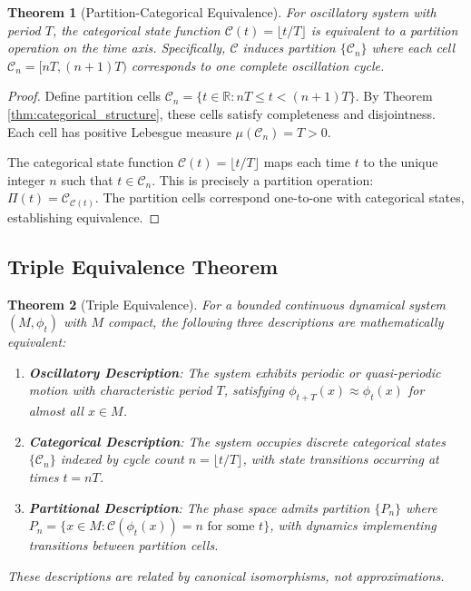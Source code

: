 \documentclass[twocolumn,10pt]{article}
\newtheorem{theorem}{Theorem}[section]
\begin{document}
\begin{theorem}[Partition-Categorical Equivalence]
\label{thm:partition_categorical}
For oscillatory system with period $T$, the categorical state function $\mathcal{C}(t) = \lfloor t/T \rfloor$ is equivalent to a partition operation on the time axis. Specifically, $\mathcal{C}$ induces partition $\{\mathcal{C}_n\}$ where each cell $\mathcal{C}_n = [nT, (n+1)T)$ corresponds to one complete oscillation cycle.
\end{theorem}

\begin{proof}
Define partition cells $\mathcal{C}_n = \{t \in \mathbb{R} : nT \leq t < (n+1)T\}$. By Theorem \ref{thm:categorical_structure}, these cells satisfy completeness and disjointness. Each cell has positive Lebesgue measure $\mu(\mathcal{C}_n) = T > 0$.

The categorical state function $\mathcal{C}(t) = \lfloor t/T \rfloor$ maps each time $t$ to the unique integer $n$ such that $t \in \mathcal{C}_n$. This is precisely a partition operation: $\Pi(t) = \mathcal{C}_{\mathcal{C}(t)}$. The partition cells correspond one-to-one with categorical states, establishing equivalence.
\end{proof}

\subsection{Triple Equivalence Theorem}

\begin{theorem}[Triple Equivalence]
\label{thm:triple_equivalence}
For a bounded continuous dynamical system $(M, \phi_t)$ with $M$ compact, the following three descriptions are mathematically equivalent:
\begin{enumerate}
\item \textbf{Oscillatory Description}: The system exhibits periodic or quasi-periodic motion with characteristic period $T$, satisfying $\phi_{t+T}(x) \approx \phi_t(x)$ for almost all $x \in M$.

\item \textbf{Categorical Description}: The system occupies discrete categorical states $\{\mathcal{C}_n\}$ indexed by cycle count $n = \lfloor t/T \rfloor$, with state transitions occurring at times $t = nT$.

\item \textbf{Partitional Description}: The phase space admits partition $\{P_n\}$ where $P_n = \{x \in M : \mathcal{C}(\phi_t(x)) = n \text{ for some } t\}$, with dynamics implementing transitions between partition cells.
\end{enumerate}
These descriptions are related by canonical isomorphisms, not approximations.
\end{theorem}
\end{document}

